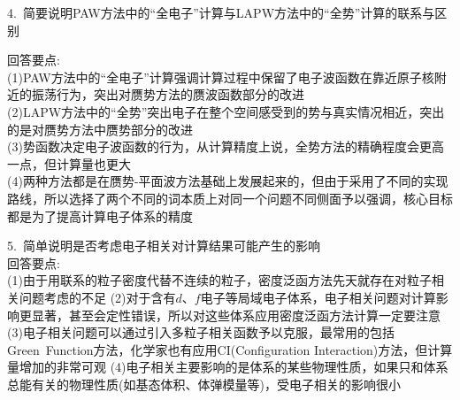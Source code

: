 4.~简要说明\textrm{PAW}方法中的``全电子''计算与\textrm{LAPW}方法中的``全势''计算的联系与区别

{\heiti 回答要点:}\\
(1)\textrm{PAW}方法中的``全电子''计算强调计算过程中保留了电子波函数在靠近原子核附近的振荡行为，突出对赝势方法的赝波函数部分的改进\\
(2)\textrm{LAPW}方法中的``全势''突出电子在整个空间感受到的势与真实情况相近，突出的是对赝势方法中赝势部分的改进\\
(3)势函数决定电子波函数的行为，从计算精度上说，全势方法的精确程度会更高一点，但计算量也更大\\
(4)两种方法都是在赝势-平面波方法基础上发展起来的，但由于采用了不同的实现路线，所以选择了两个不同的词本质上对同一个问题不同侧面予以强调，核心目标都是为了提高计算电子体系的精度

5.~简单说明是否考虑电子相关对计算结果可能产生的影响\\

{\heiti 回答要点:}\\
(1)由于用联系的粒子密度代替不连续的粒子，密度泛函方法先天就存在对粒子相关问题考虑的不足
(2)对于含有$d$、$f$电子等局域电子体系，电子相关问题对计算影响更显著，甚至会定性错误，所以对这些体系应用密度泛函方法计算一定要注意
(3)电子相关问题可以通过引入多粒子相关函数予以克服，最常用的包括\textrm{Green~Function}方法，化学家也有应用\textrm{CI(Configuration Interaction)}方法，但计算量增加的非常可观
(4)电子相关主要影响的是体系的某些物理性质，如果只和体系总能有关的物理性质(如基态体积、体弹模量等)，受电子相关的影响很小
